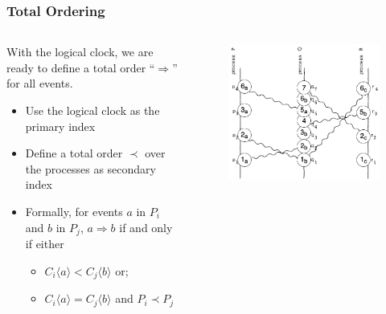 \documentclass{beamer}
\begin{document}
\frame
{
	\frametitle{Total Ordering}
	\begin{columns}
	\begin{column}{0.6\textwidth}


		With the logical clock, we are ready to define a total order ``$\Rightarrow$'' for all events.

		\begin{itemize}
			\item<2-> Use the logical clock as the primary index
			\item<3-> Define a total order $\prec$ over the processes as secondary index
			\item<4-> Formally, for events $a$ in $P_i$ and $b$ in $P_j$, $a\Rightarrow b$ if and only if either
				\begin{itemize}
					\item $C_i\langle a\rangle < C_j\langle b\rangle$ or;
					\item $C_i\langle a\rangle = C_j\langle b\rangle$ and $P_i\prec P_j$
				\end{itemize}
		\end{itemize}

	\end{column}
	\begin{column}{0.4\textwidth}

		\begin{figure}[ht!]
		\includegraphics[width=\textwidth]{files/ClockDist-Total-Order.png}
		\end{figure}


	\end{column}
	\end{columns}
}
\end{document}
